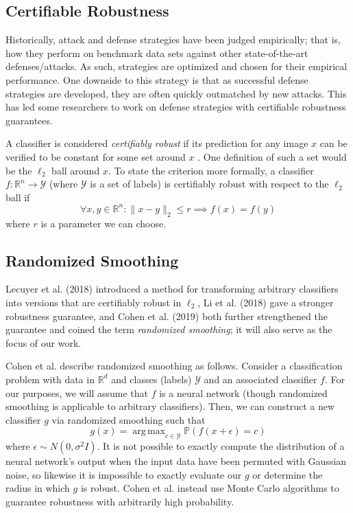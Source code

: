 \documentclass{article}
\DeclareMathOperator*{\argmax}{arg\,max}
\begin{document}
\subsection{Certifiable Robustness}
Historically, attack and defense strategies have been judged empirically; that is, how they perform on benchmark data sets against other state-of-the-art defenses/attacks. As such, strategies are optimized and chosen for their empirical performance. One downside to this strategy is that as successful defense strategies are developed, they are often quickly outmatched by new attacks.\cite{CW17} This has led some researchers to work on defense strategies with certifiable robustness guarantees. \newline

A classifier is considered \emph{certifiably robust} if its prediction for any image $x$ can be verified to be constant for some set around $x$ \cite{KW17} \cite{RSL18}. One definition of such a set would be the $\ell_2$ ball around $x$. To state the criterion more formally, a classifier $f: \mathbb{R}^n \rightarrow \mathcal{Y}$ (where $\mathcal{Y}$ is a set of labels) is certifiably robust with respect to the $\ell_2$ ball if
\[ \forall x, y \in \mathbb{R}^n : \| x - y \|_2 \leq r \implies f(x) = f(y) \]
where $r$ is a parameter we can choose. \newline

\subsection{Randomized Smoothing}
Lecuyer et al. (2018) \cite{LAGHJ18} introduced a method for transforming arbitrary classifiers into versions that are certifiably robust in $\ell_2$, Li et al. (2018) \cite{LCWC18} gave a stronger robustness guarantee, and Cohen et al. (2019) \cite{CRK19} both further strengthened the guarantee and coined the term \emph{randomized smoothing}; it will also serve as the focus of our work. \newline

Cohen et al. describe randomized smoothing as follows. Consider a classification problem with data in $\mathbb{R}^d$ and classes (labels) $\mathcal{Y}$ and an associated classifier $f$. For our purposes, we will assume that $f$ is a neural network (though randomized smoothing is applicable to arbitrary classifiers). Then, we can construct a new classifier $g$ via randomized smoothing such that
\[ g(x) = \argmax_{c \in \mathcal{Y}} \mathbb{P}\left( f(x + \epsilon) = c \right) \]
where $\epsilon \sim N(0, \sigma^2 I)$. It is not possible to exactly compute the distribution of a neural network's output when the input data have been permuted with Gaussian noise, so likewise it is impossible to exactly evaluate our $g$ or determine the radius in which $g$ is robust. Cohen et al. instead use Monte Carlo algorithms to guarantee robustness with arbitrarily high probability. \newline
\end{document}
